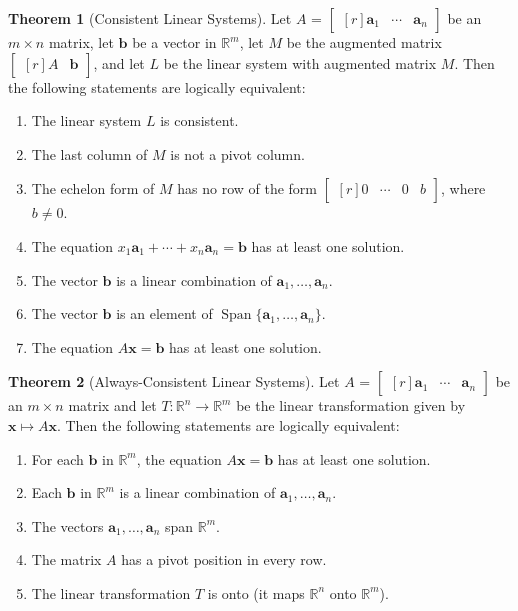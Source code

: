 \documentclass{myart}
\renewcommand{\vec}[1]{\ensuremath{\mathbf{#1}}} %
\newcommand{\mat}[1]{\ensuremath{#1}} %
\newcommand{\R}[1][]{\ensuremath{\mathbb{R}^{#1}}} %
\newcommand{\by}{\ensuremath{\times}} %
\newcommand{\MAT}[2][r]{\ensuremath{\begin{bmatrix*}[#1]#2\end{bmatrix*}}} %
\DeclareMathOperator{\OpSpan}{Span} %
\newcommand{\Span}[1]{\ensuremath{\OpSpan\{#1\}}} %
\newcommand{\many}[2][n]{\ensuremath{{#2}_1, \ldots, {#2}_{#1}}} %
\theoremstyle{definition}
\newtheorem{thm}{Theorem}
\begin{document}
\begin{thm}[Consistent Linear Systems]
Let \mat A = \MAT{\vec a_1 & \cdots & \vec a_n} be an $m \by n$ matrix, let \vec b be a vector in \R[m], let $M$ be the augmented matrix \MAT{\mat A & \vec b}, and let $L$ be the linear system with augmented matrix $M$. Then the following statements are logically equivalent:
\begin{enumerate}
\item The linear system $L$ is consistent.
\item The last column of $M$ is not a pivot column.
\item The echelon form of $M$ has no row of the form \MAT{0 & \cdots & 0 & b}, where $b \neq 0$.
\item The equation $x_1\vec a_1 + \cdots + x_n\vec a_n = \vec b$ has at least one solution.
\item The vector \vec b is a linear combination of \many{\vec a}.
\item The vector \vec b is an element of \Span{\many{\vec a}}.
\item The equation $\mat A\vec x = \vec b$ has at least one solution.
\end{enumerate}
\end{thm}

\begin{thm}[Always-Consistent Linear Systems]
Let \mat A = \MAT{\vec a_1 & \cdots & \vec a_n} be an $m \by n$ matrix and let $T : \R[n] \to \R[m]$ be the linear transformation given by $\vec x \mapsto \mat A\vec x$. Then the following statements are logically equivalent:
\begin{enumerate}
\item For each \vec b in \R[m], the equation $\mat A\vec x = \vec b$ has at least one solution.
\item Each \vec b in \R[m] is a linear combination of \many{\vec a}.
\item The vectors \many{\vec a} span \R[m].
\item The matrix \mat A has a pivot position in every row.
\item The linear transformation $T$ is onto (it maps \R[n] onto \R[m]).
\end{enumerate}
\end{thm}
\end{document}
